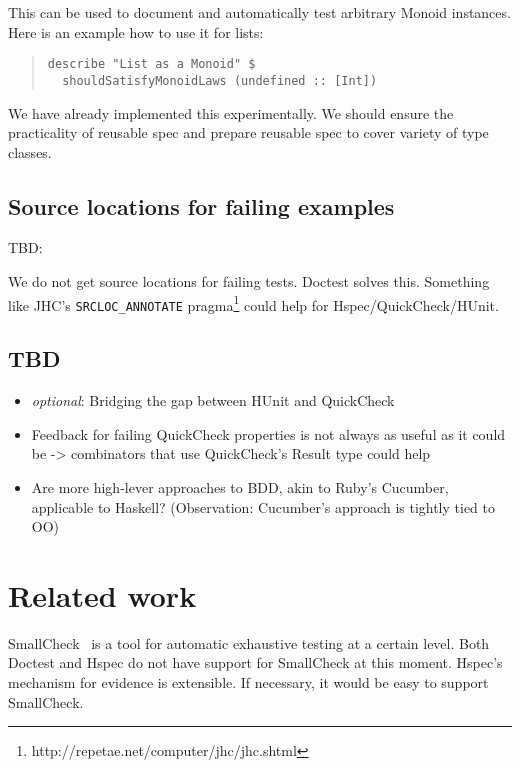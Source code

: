 \documentclass[preprint]{sigplanconf}
\begin{document}
\noindent This can be used to document and automatically test
arbitrary Monoid instances.
Here is an example how to use it for lists:

\begin{quote}
\small
\begin{verbatim}
describe "List as a Monoid" $
  shouldSatisfyMonoidLaws (undefined :: [Int])
\end{verbatim}
\end{quote}

\noindent We have already implemented this experimentally.
We should ensure the practicality of reusable spec and
prepare reusable spec to cover variety of type classes.

\subsection{Source locations for failing examples}

TBD:

We do not get source locations for failing tests. Doctest solves this.
Something like JHC's
\verb|SRCLOC_ANNOTATE|
pragma\footnote{%
http://repetae.net/computer/jhc/jhc.shtml} could help
for Hspec/QuickCheck/HUnit.

\subsection{TBD}

\begin{itemize}
    \item \emph{optional}: Bridging the gap between HUnit and QuickCheck
    \item
        Feedback for failing QuickCheck properties is not always as
        useful as it could be -> combinators that use QuickCheck's
        Result type could help
    \item
        Are more high-lever approaches to BDD, akin to Ruby's
        Cucumber, applicable to Haskell? (Observation: Cucumber's
        approach is tightly tied to OO)
\end{itemize}

\section{Related work}

SmallCheck~\cite{smallcheck} is a tool for
automatic exhaustive testing at a certain level.
Both Doctest and Hspec do not have support for SmallCheck
at this moment.
Hspec's mechanism for evidence is extensible.
If necessary, it would be easy to support SmallCheck.
\end{document}
